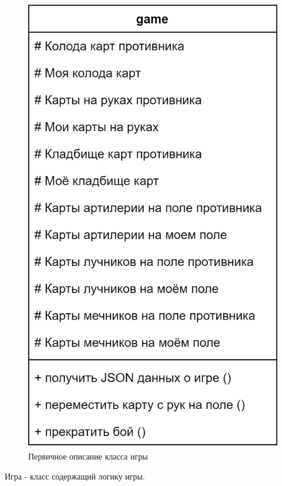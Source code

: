 \documentclass[12pt, a4paper, simple]{eskdtext}
\begin{document}
    \begin{figure}[!h]
        \centering
        \includegraphics[]
            {../sources/game_architecture/build/game__first_class_diagram.png}
        \caption{Первичное описание класса игры}
        \label{fig:game__first_class_diagram}
    \end{figure}

    Игра - класс содержащий логику игры.
\end{document}
